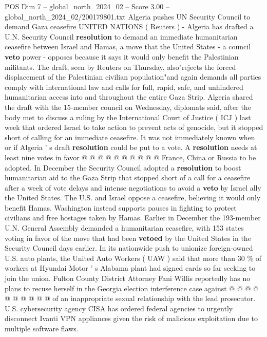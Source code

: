 \begin{textsample}{POS Dim 7 – global\_north\_2024\_02 – Score 3.00 – global\_north\_2024\_02/200179801.txt}  \label{ex:f7_pos_161}
Algeria pushes UN Security Council to demand Gaza ceasefire UNITED NATIONS ( Reuters ) - Algeria has drafted a U.N.
Security Council \textbf{resolution} to demand an immediate humanitarian ceasefire between Israel and Hamas, a move that the United States - a council \textbf{veto} power - opposes because it says it would only benefit the Palestinian militants.
The draft, seen by Reuters on Thursday, also"rejects the forced displacement of the Palestinian civilian population"and again demands all parties comply with international law and calls for full, rapid, safe, and unhindered humanitarian access into and throughout the entire Gaza Strip.
Algeria shared the draft with the 15-member council on Wednesday, diplomats said, after the body met to discuss a ruling by the International Court of Justice ( ICJ ) last week that ordered Israel to take action to prevent acts of genocide, but it stopped short of calling for an immediate ceasefire.
It was not immediately known when or if Algeria ' s draft \textbf{resolution} could be put to a vote.
A \textbf{resolution} needs at least nine votes in favor @ @ @ @ @ @ @ @ @ @ France, China or Russia to be adopted.
In December the Security Council adopted a \textbf{resolution} to boost humanitarian aid to the Gaza Strip that stopped short of a call for a ceasefire after a week of vote delays and intense negotiations to avoid a \textbf{veto} by Israel ally the United States.
The U.S. and Israel oppose a ceasefire, believing it would only benefit Hamas.
Washington instead supports pauses in fighting to protect civilians and free hostages taken by Hamas.
Earlier in December the 193-member U.N.
General Assembly demanded a humanitarian ceasefire, with 153 states voting in favor of the move that had been \textbf{vetoed} by the United States in the Security Council days earlier.
In its nationwide push to unionize foreign-owned U.S. auto plants, the United Auto Workers ( UAW ) said that more than 30 \% of workers at Hyundai Motor ' s Alabama plant had signed cards so far seeking to join the union.
Fulton County District Attorney Fani Willis reportedly has no plans to recuse herself in the Georgia election interference case against @ @ @ @ @ @ @ @ @ @ of an inappropriate sexual relationship with the lead prosecutor.
U.S. cybersecurity agency CISA has ordered federal agencies to urgently disconnect Ivanti VPN appliances given the risk of malicious exploitation due to multiple software flaws.

\end{textsample}
